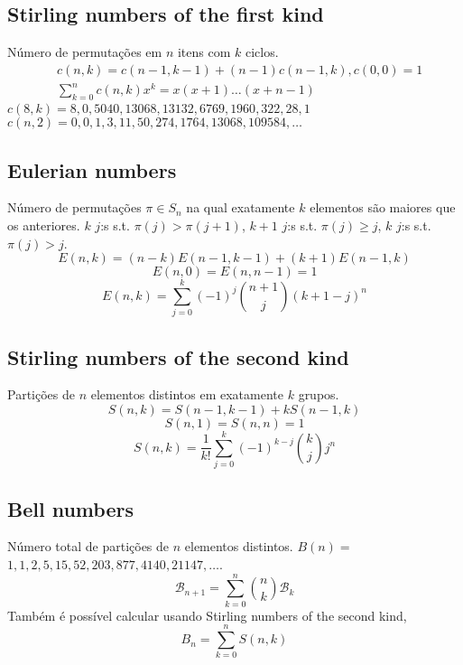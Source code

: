 
	\subsection{Stirling numbers of the first kind}
		Número de permutações em $n$ itens com $k$ ciclos.
		\begin{align*}
			&c(n,k) = c(n-1,k-1) + (n-1) c(n-1,k), c(0,0) = 1\\
			&\textstyle \sum_{k=0}^n c(n,k)x^k = x(x+1) \dots (x+n-1)
		\end{align*}
		$c(8,k) = 8, 0, 5040, 13068, 13132, 6769, 1960, 322, 28, 1$ 
		$c(n,2) = 0, 0, 1, 3, 11, 50, 274, 1764, 13068, 109584, \dots$

	\subsection{Eulerian numbers}
		Número de permutações $\pi \in S_n$ na qual exatamente $k$ elementos são maiores que os anteriores. $k$ $j$:s s.t. $\pi(j)>\pi(j+1)$, $k+1$ $j$:s s.t. $\pi(j)\geq j$, $k$ $j$:s s.t. $\pi(j)>j$.
		$$E(n,k) = (n-k)E(n-1,k-1) + (k+1)E(n-1,k)$$
		$$E(n,0) = E(n,n-1) = 1$$
		$$E(n,k) = \sum_{j=0}^k(-1)^j\binom{n+1}{j}(k+1-j)^n$$

	\subsection{Stirling numbers of the second kind}
		Partições de $n$ elementos distintos em exatamente $k$ grupos.
		$$S(n,k) = S(n-1,k-1) + k S(n-1,k)$$
		$$S(n,1) = S(n,n) = 1$$
		$$S(n,k) = \frac{1}{k!}\sum_{j=0}^k (-1)^{k-j}\binom{k}{j}j^n$$

	\subsection{Bell numbers}
		Número total de partições de $n$ elementos distintos. $B(n) =$
		$1, 1, 2, 5, 15, 52, 203, 877, 4140, 21147, \dots$. 
		\begin{equation*}
        \mathcal{B}_{n+1} = \sum_{k=0}^n \binom{n}{k} \mathcal{B}_k
      \end{equation*}
      Também é possível calcular usando Stirling numbers of the second kind,
      \[B_n = \sum_{k = 0}^{n} S(n, k)\]

